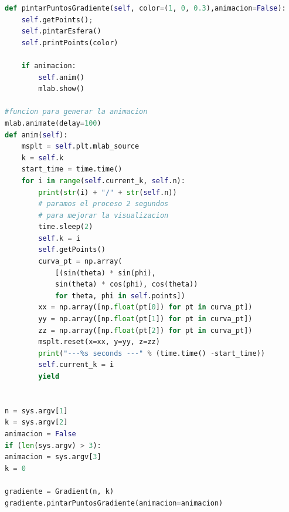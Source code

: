 \begin{lstlisting}[language=Python]
def pintarPuntosGradiente(self, color=(1, 0, 0.3),animacion=False):
	self.getPoints();
	self.pintarEsfera()
	self.printPoints(color)
	
	if animacion:
		self.anim()
		mlab.show()

#funcion para generar la animacion
mlab.animate(delay=100)
def anim(self):
	msplt = self.plt.mlab_source
	k = self.k
	start_time = time.time()  
	for i in range(self.current_k, self.n):
		print(str(i) + "/" + str(self.n))
		# paramos el proceso 2 segundos
		# para mejorar la visualizacion
		time.sleep(2)
		self.k = i
		self.getPoints()
		curva_pt = np.array(
			[(sin(theta) * sin(phi), 
			sin(theta) * cos(phi), cos(theta)) 
			for theta, phi in self.points])
		xx = np.array([np.float(pt[0]) for pt in curva_pt])
		yy = np.array([np.float(pt[1]) for pt in curva_pt])
		zz = np.array([np.float(pt[2]) for pt in curva_pt])
		msplt.reset(x=xx, y=yy, z=zz)
		print("---%s seconds ---" % (time.time() -start_time))
		self.current_k = i
		yield


n = sys.argv[1]
k = sys.argv[2]
animacion = False
if (len(sys.argv) > 3):
animacion = sys.argv[3]
k = 0

gradiente = Gradient(n, k)
gradiente.pintarPuntosGradiente(animacion=animacion)

\end{lstlisting}
